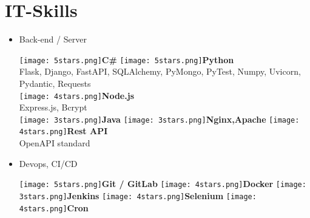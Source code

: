 \documentclass[]{friggeri-cv}
\begin{document}
\section{IT-Skills}
        \vspace*{-0.45cm}
        \setlength{\columnsep}{-0.3cm}
        \begin{flushleft}
        \begin{multicols}{3}
		\begin{itemize}
		
		\setlength{\itemsep}{5pt}
  		\setlength{\parskip}{0pt}
  		\setlength{\parsep}{0pt}
          
        
\item \large Back-end / Server \
\normalsize
\begin{flushleft}

\texttt{[image: 5stars.png]}\hspace{1.5mm}\textbf{C\#}
\texttt{[image: 5stars.png]}\hspace{1.5mm}\textbf{Python}\\Flask, Django, FastAPI, SQLAlchemy, PyMongo, PyTest, Numpy, Uvicorn, Pydantic, Requests\\\vspace{2mm}
\texttt{[image: 4stars.png]}\hspace{1.5mm}\textbf{Node.js}\\Express.js, Bcrypt\\
\texttt{[image: 3stars.png]}\hspace{1.5mm}\textbf{Java}
\texttt{[image: 3stars.png]}\hspace{1.5mm}\textbf{\small Nginx,Apache}
\texttt{[image: 4stars.png]}\hspace{1.5mm}\textbf{Rest API}\\OpenAPI standard\\
\end{flushleft}            

\columnbreak
\item \large Devops, CI/CD \
\normalsize
\begin{flushleft}

\texttt{[image: 5stars.png]}\hspace{1.5mm}\textbf{Git / GitLab}
\texttt{[image: 4stars.png]}\hspace{1.5mm}\textbf{Docker}
\texttt{[image: 3stars.png]}\hspace{1.5mm}\textbf{Jenkins}
\texttt{[image: 4stars.png]}\hspace{1.5mm}\textbf{Selenium}
\texttt{[image: 4stars.png]}\hspace{1.5mm}\textbf{Cron}
\end{flushleft}            


\end{itemize}
\end{multicols}
\end{flushleft}
\end{document}
